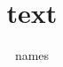 \documentclass{beamer}
\title{text}
\author{names}
\begin{document}
	
\begin{frame}
	\titlepage
\end{frame}	
	
\end{document}
